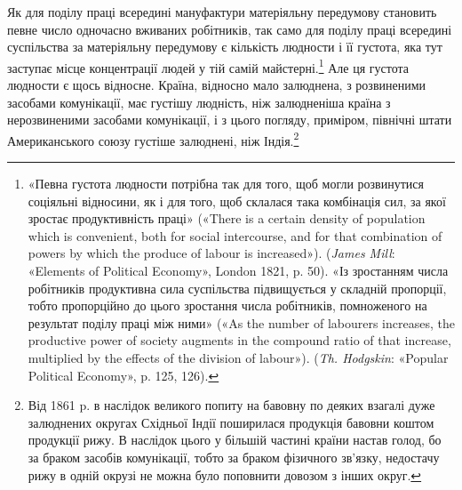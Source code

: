 Як для поділу праці всередині мануфактури матеріяльну передумову
становить певне число одночасно вживаних робітників,
так само для поділу праці всередині суспільства за матеріяльну
передумову є кількість людности і її густота, яка тут заступає
місце концентрації людей у тій самій майстерні.\footnote{
«Певна густота людности потрібна так для того, щоб могли розвинутися
соціяльні відносини, як і для того, щоб склалася така комбінація
сил, за якої зростає продуктивність праці» («There is a certain
density of population which is convenient, both for social intercourse,
and for that combination of powers by which the produce of labour is increased»).
(\emph{James Mill}: «Elements of Political Economy», London 1821,
p. 50). «Із зростанням числа робітників продуктивна сила суспільства
підвищується у складній пропорції, тобто пропорційно до цього зростання
числа робітників, помноженого на результат поділу праці між ними»
(«As the number of labourers increases, the productive power of society
augments in the compound ratio of that increase, multiplied by the
effects of the division of labour»). (\emph{Th. Hodgskin}: «Popular Political Economy»,
p. 125, 126).
} Але ця густота
людности є щось відносне. Країна, відносно мало залюднена,
з розвиненими засобами комунікації, має густішу людність, ніж
залюдненіша країна з нерозвиненими засобами комунікації, і з
цього погляду, приміром, північні штати Американського союзу
густіше залюднені, ніж Індія.\footnote{
Від 1861 p. в наслідок великого попиту на бавовну по деяких
взагалі дуже залюднених округах Східньої Індії поширилася продукція
бавовни коштом продукції рижу. В наслідок цього у більшій частині
країни настав голод, бо за браком засобів комунікації, тобто за браком
фізичного зв'язку, недостачу рижу в одній окрузі не можна було поповнити
довозом з інших округ.
}

